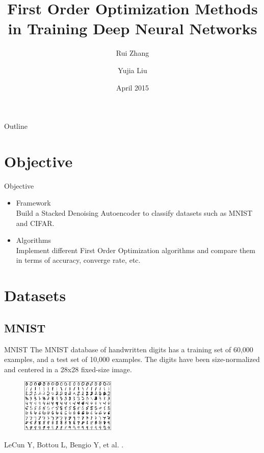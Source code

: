 \documentclass{beamer}
\title{First Order Optimization Methods in Training Deep Neural Networks}
\author{Rui Zhang \and Yujia Liu}
\date{April 2015}
\begin{document}
\begin{frame}
  \titlepage
\end{frame}

\begin{frame}{Outline}
  \tableofcontents
\end{frame}

\section{Objective}

\begin{frame}{Objective}
    
\begin{itemize}
    \item Framework
    \\
    Build a Stacked Denoising Autoencoder to classify datasets such as MNIST and CIFAR.
    \item Algorithms
    \\
    Implement different First Order Optimization algorithms and compare them in terms of accuracy, converge rate, etc.
\end{itemize}

\end{frame}


\section{Datasets}

\subsection{MNIST}
\begin{frame}{MNIST}
The MNIST database of handwritten digits has a training set of 60,000 examples, and a test set of 10,000 examples. The digits have been size-normalized and centered in a 28x28 fixed-size image. 

\begin{figure}[h!]
\centering
\includegraphics[width=0.4\textwidth]{MNIST.png}
\end{figure}

\begin{thebibliography}{9}
\beamertemplatebookbibitems
{}
LeCun Y, Bottou L, Bengio Y, et al.
.
\end{thebibliography}

\end{frame}
\end{document}
